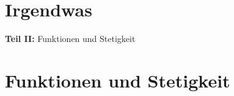 \documentclass[consecutivenumbering, transparentEnvironments]{gadsescript}
\begin{document}
\maketitle

\tableofcontents
\newpage

\part{Irgendwas}






\textbf{Teil II:} Funktionen und Stetigkeit
\part{Funktionen und Stetigkeit}



\end{document}

